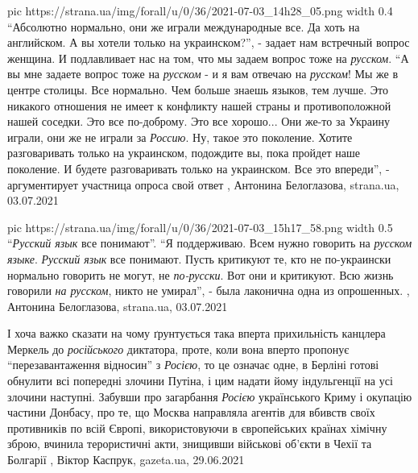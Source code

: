\ifcmt
  pic https://strana.ua/img/forall/u/0/36/2021-07-03_14h28_05.png
	width 0.4
\fi
\enquote{Абсолютно нормально, они же играли международные все. Да хоть на английском. А
вы хотели только на украинском?}, - задает нам встречный вопрос женщина. И
подлавливает нас на том, что мы задаем вопрос тоже на \emph{русском}.  \enquote{А вы мне
задаете вопрос тоже на \emph{русском} - и я вам отвечаю на \emph{русском}! Мы же в центре
столицы. Все нормально. Чем больше знаешь языков, тем лучше. Это никакого
отношения не имеет к конфликту нашей страны и противоположной нашей соседки.
Это все по-доброму. Это все хорошо... Они же-то за Украину играли, они же не
играли за \emph{Россию}. Ну, такое это поколение. Хотите разговаривать только на
украинском, подождите вы, пока пройдет наше поколение. И будете разговаривать
только на украинском. Все это впереди}, - аргументирует участница опроса свой
ответ
, 
Антонина Белоглазова, strana.ua, 03.07.2021

\ifcmt
  pic https://strana.ua/img/forall/u/0/36/2021-07-03_15h17_58.png
	width 0.5
\fi
\enquote{\emph{Русский язык} все понимают}.  \enquote{Я поддерживаю. Всем нужно говорить на \emph{русском
языке}. \emph{Русский язык} все понимают. Пусть критикуют те, кто не по-украински
нормально говорить не могут, не \emph{по-русски}. Вот они и критикуют. Всю жизнь
говорили \emph{на русском}, никто не умирал}, - была лаконична одна из опрошенных.
, 
Антонина Белоглазова, strana.ua, 03.07.2021

І хоча важко сказати на чому ґрунтується така вперта прихильність канцлера
Меркель до \emph{російського} диктатора, проте, коли вона вперто пропонує
\enquote{перезавантаження відносин} з \emph{Росією}, то це означає одне, в Берліні
готові обнулити всі попередні злочини Путіна, і цим надати йому індульгенції на
усі злочини наступні.  Забувши про загарбання \emph{Росією} українського Криму
і окупацію частини Донбасу, про те, що Москва направляла агентів для вбивств
своїх противників по всій Європі, використовуючи в європейських країнах хімічну
зброю, вчинила терористичні акти, знищивши військові об'єкти в Чехії та
Болгарії
, 
Віктор Каспрук, gazeta.ua, 29.06.2021

